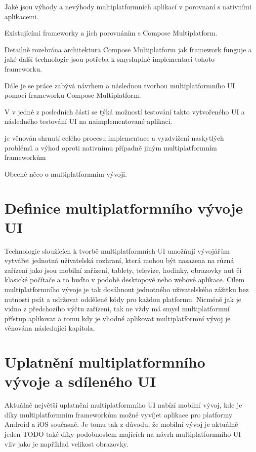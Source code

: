 




Jaké jsou výhody a nevýhody multiplatformních aplikací  v porovnaní s nativními aplikacemi.

Existujícími frameworky a jich porovnáním s Compose Multiplatform.

Detailně rozebrána architektura Compose Multiplatform jak framework funguje a jaké další technologie jsou potřeba k smysluplné implementaci tohoto
frameworku.

Dále je se práce zabývá návrhem a následnou tvorbou multiplatformního UI pomocí frameworku Compose Multiplatform.

V v jedné z posledních části se týká možností testování takto vytvořeného UI a následného testování UI na naimplementované aplikaci.

je věnován shrnutí celého procesu implementace a vyzdvižení naskytlých problémů a výhod oproti nativnímu případně jiným multiplatformním frameworkům



Obecně něco o multiplatformním vývoji.

\section{Definice multiplatformního vývoje UI}

Technologie sloužících k tvorbě multiplatformních UI umožňují vývojářům vytvářet jednotná uživatelská rozhraní, 
která mohou být nasazena na různá zařízení jako jsou mobilní zařízení, tablety, televize, hodinky, obrazovky aut či 
klasické počítače a to buďto v podobě desktopové nebo webové aplikace. Cílem multiplatformního vývoje je tak dosáhnout jednotného 
uživatelského zážitku bez nutnosti psát a udržovat oddělené kódy pro každou platformu. Nicméně jak je vidno z předchozího výčtu zařízení, 
tak ne vždy má smysl multiplatformní přístup aplikovat a tomu kdy je vhodné aplikovat multiplatformní vývoj je věnována následující kapitola.  

\section{Uplatnění multiplatformního vývoje a sdíleného UI}
Aktuálně největší uplatnění multiplatformního UI nabízí mobilní vývoj, kde je díky multiplatformním frameworkům možné vyvíjet
aplikace pro platformy Android a iOS současně. Je tomu tak z důvodu, že mobilní vývoj je aktuálně jeden TODO také díky podobnostem majících na návrh multiplatformního 
UI vliv jako je například velikost obrazovky.

